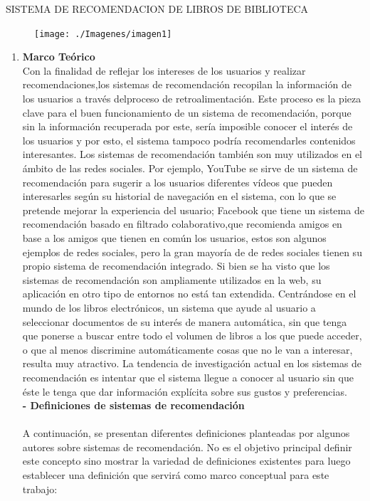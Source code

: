 \newpage
\begin{center}
    SISTEMA DE RECOMENDACION DE LIBROS DE BIBLIOTECA
\end{center}
\begin{figure}[htb]
\begin{center}
\texttt{[image: ./Imagenes/imagen1]}
\end{center}
\end{figure}
\begin{enumerate}
    \item \textbf {Marco Teórico}\\
    Con la finalidad de reflejar los intereses de los usuarios y realizar recomendaciones,los sistemas de recomendación recopilan la información de los usuarios a través delproceso de retroalimentación. Este proceso es la pieza clave para el buen funcionamiento de un sistema de recomendación, porque sin la información recuperada por este, sería imposible conocer el interés de los usuarios y por esto, el sistema tampoco podría recomendarles contenidos interesantes.
    Los sistemas de recomendación también son muy utilizados en el ámbito de las redes sociales. Por ejemplo, YouTube se sirve de un sistema de recomendación para sugerir a los usuarios diferentes vídeos que pueden interesarles según su historial de navegación en el sistema, con lo que se pretende mejorar la experiencia del usuario; Facebook que tiene un sistema de recomendación basado en filtrado colaborativo,que recomienda amigos en base a los amigos que tienen en común los usuarios, estos son algunos ejemplos de redes sociales, pero la gran mayoría de de redes sociales tienen su propio sistema de recomendación integrado.
    Si bien se ha visto que los sistemas de recomendación son ampliamente utilizados en la web, su aplicación en otro tipo de entornos no está tan extendida. Centrándose en el mundo de los libros electrónicos, un sistema que ayude al usuario a seleccionar documentos de su interés de manera automática, sin que tenga que ponerse a buscar entre todo el volumen de libros a los que puede acceder, o que al menos discrimine automáticamente cosas que no le van a interesar, resulta muy atractivo. La tendencia de investigación actual en los sistemas de recomendación es intentar que el sistema llegue a conocer al usuario sin que éste le tenga que dar información explícita sobre sus gustos y preferencias.\\
    
    \textbf{- Definiciones de sistemas de recomendación}\\\\
    A continuación, se presentan diferentes definiciones planteadas por algunos autores sobre sistemas de recomendación. No es el objetivo principal definir este concepto sino mostrar la variedad de definiciones existentes para luego establecer una definición que servirá como marco conceptual para este trabajo:\\
    

\end{enumerate}
